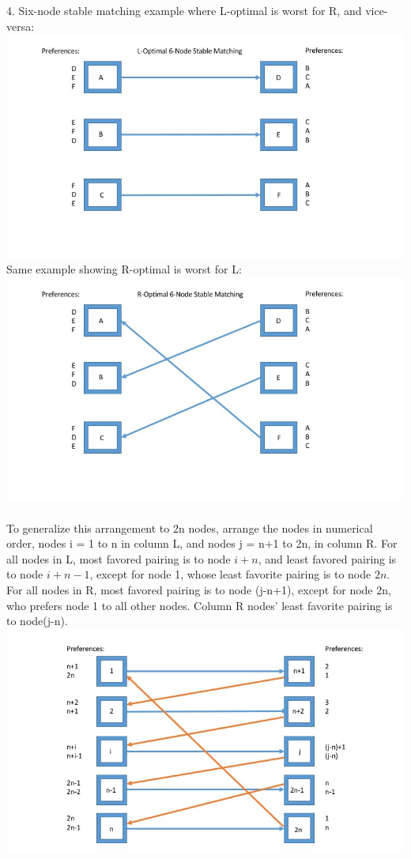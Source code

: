 \documentclass[11pt, oneside]{article}   	%
\begin{document}
4.  Six-node stable matching example where L-optimal is worst for R, and vice-versa:\\
\includegraphics[scale=0.5]{lOptimal}\\
\indent Same example showing R-optimal is worst for L:\\
\includegraphics[scale=0.5]{rOptimal}\\\\
\indent To generalize this arrangement to 2n nodes, arrange the nodes in numerical order, nodes i = 1 to n in column L, and nodes j = n+1 to 2n, in column R.  For all nodes in L, most favored pairing is to node $i+n$, and least favored pairing is to node $i+n-1$, except for node 1, whose least favorite pairing is to node $2n$.  For all nodes in R, most favored pairing is to node (j-n+1), except for node 2n, who prefers node 1 to all other nodes.  Column R nodes' least favorite pairing is to node(j-n).\\
\includegraphics[scale=0.5]{2n}
\end{document}

